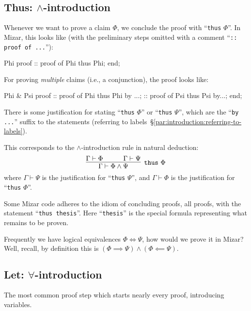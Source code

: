\subsection{Thus: $\land$-introduction}
Whenever we want to prove a claim $\Phi$, we conclude the proof with
``\texttt{thus} $\Phi$''. In Mizar, this looks like (with the
preliminary steps omitted with a comment ``\verb#:: proof of ...#''):

\begin{mizar}
Phi
proof
  :: proof of Phi
  thus Phi;
end;
\end{mizar}

For proving \emph{multiple} claims (i.e., a conjunction), the proof
looks like:

\begin{mizar}
Phi & Psi
proof
  :: proof of Phi
  thus Phi by ...;
  :: proof of Psi
  thus Psi by...;
end;
\end{mizar}
There is some justification for stating ``\verb#thus# $\Phi$'' or
``\verb#thus# $\Psi$'', which are the ``\verb#by ...#'' suffix to the
statements (referring to labels~\S\ref{par:introduction:referring-to-labels}).

This corresponds to the $\land$-introduction rule in natural deduction:
\begin{equation}
  \vcenter{\infer[\mathtt{thus}~\Phi]{\Gamma\vdash\Phi\land\Psi}{
    \Gamma\vdash\Phi &\qquad \Gamma\vdash\Psi}}
\end{equation}
where $\Gamma\vdash\Psi$ is the justification for ``\verb#thus# $\Psi$'',
and $\Gamma\vdash\Phi$ is the justification for ``\verb#thus# $\Phi$''.

\begin{remark}
Some Mizar code adheres to the idiom of concluding proofs, all proofs,
with the statement ``\verb#thus thesis#''. Here ``\verb#thesis#'' is the
special formula representing what remains to be proven.
\end{remark}

\begin{exercise}
Frequently we have logical equivalences $\Phi\iff\Psi$, how would we
prove it in Mizar? Well, recall, by definition this is
$(\Phi\implies\Psi)\land(\Phi\impliedby\Psi)$.
\end{exercise}

\subsection{Let: $\forall$-introduction}
The most common proof step which starts nearly every proof, introducing
variables.


